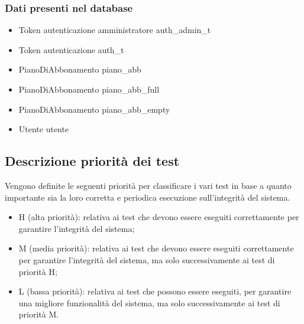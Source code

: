 \subsubsection*{Dati presenti nel database}
\begin{itemize}
    \item Token autenticazione amministratore auth\_admin\_t
    \item Token autenticazione auth\_t
    \item PianoDiAbbonamento piano\_abb
    \item PianoDiAbbonamento piano\_abb\_full
    \item PianoDiAbbonamento piano\_abb\_empty
    \item Utente utente

\end{itemize}

\subsection*{Descrizione priorità dei test}

Vengono definite le seguenti priorità per classificare i vari test in base a quanto importante sia la 
loro corretta e periodica esecuzione sull'integrità del sistema.
\begin{itemize}
    \item H (alta priorità): relativa ai test che devono essere eseguiti correttamente per garantire l'integrità
    del sistema;
    \item M (media priorità): relativa ai test che devono essere eseguiti correttamente per garantire l'integrità
    del sistema, ma solo successivamente ai test di priorità H;
    \item L (bassa priorità): relativa ai test che possono essere eseguiti, per garantire una migliore funzionalità
    del sistema, ma solo successivamente ai test di priorità M.
\end{itemize}


